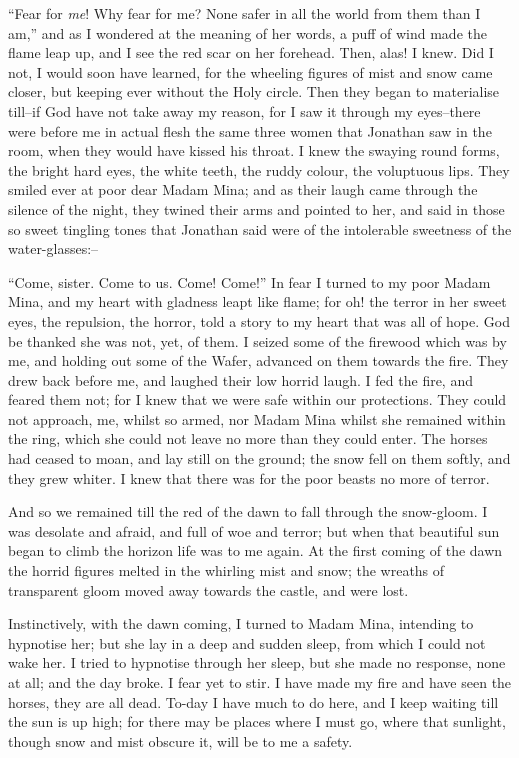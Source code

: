 \documentclass[12pt,openright]{book}
\begin{document}
“Fear for \textit{me}! Why fear for me? None safer in all the world from them than I am,” and as I wondered at the meaning of her words, a puff of wind made the flame leap up, and I see the red scar on her forehead. Then, alas! I knew. Did I not, I would soon have learned, for the wheeling figures of mist and snow came closer, but keeping ever without the Holy circle. Then they began to materialise till–if God have not take away my reason, for I saw it through my eyes–there were before me in actual flesh the same three women that Jonathan saw in the room, when they would have kissed his throat. I knew the swaying round forms, the bright hard eyes, the white teeth, the ruddy colour, the voluptuous lips. They smiled ever at poor dear Madam Mina; and as their laugh came through the silence of the night, they twined their arms and pointed to her, and said in those so sweet tingling tones that Jonathan said were of the intolerable sweetness of the water-glasses:–

“Come, sister. Come to us. Come! Come!” In fear I turned to my poor Madam Mina, and my heart with gladness leapt like flame; for oh! the terror in her sweet eyes, the repulsion, the horror, told a story to my heart that was all of hope. God be thanked she was not, yet, of them. I seized some of the firewood which was by me, and holding out some of the Wafer, advanced on them towards the fire. They drew back before me, and laughed their low horrid laugh. I fed the fire, and feared them not; for I knew that we were safe within our protections. They could not approach, me, whilst so armed, nor Madam Mina whilst she remained within the ring, which she could not leave no more than they could enter. The horses had ceased to moan, and lay still on the ground; the snow fell on them softly, and they grew whiter. I knew that there was for the poor beasts no more of terror.

And so we remained till the red of the dawn to fall through the snow-gloom. I was desolate and afraid, and full of woe and terror; but when that beautiful sun began to climb the horizon life was to me again. At the first coming of the dawn the horrid figures melted in the whirling mist and snow; the wreaths of transparent gloom moved away towards the castle, and were lost.

Instinctively, with the dawn coming, I turned to Madam Mina, intending to hypnotise her; but she lay in a deep and sudden sleep, from which I could not wake her. I tried to hypnotise through her sleep, but she made no response, none at all; and the day broke. I fear yet to stir. I have made my fire and have seen the horses, they are all dead. To-day I have much to do here, and I keep waiting till the sun is up high; for there may be places where I must go, where that sunlight, though snow and mist obscure it, will be to me a safety.
\end{document}
